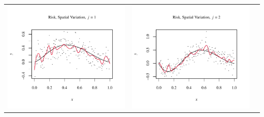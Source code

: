 \documentclass[11pt]{article}
\begin{document}
\begin{table}[h!]
  \begin{center}
    \renewcommand{\arraystretch}{1.5}
    \begin{tabular}{| >{\centering\arraybackslash}m{2.1in} |  >{\centering\arraybackslash}m{2.1in} |  >{\centering\arraybackslash}m{2.1in}|}
      \hline
      \includegraphics[width=1\linewidth,height=0.18\textheight]{Graphs/4/3/assignment5_a_4_3_1}&
      \includegraphics[width=1\linewidth,height=0.18\textheight]{Graphs/4/3/assignment5_a_4_3_2}&

\end{tabular}
\end{center}
\end{table}
\end{document}
